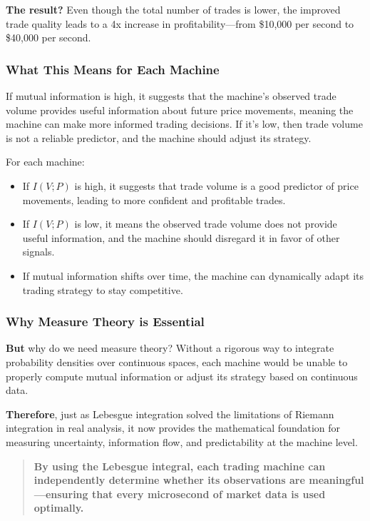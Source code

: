 \textbf{The result?} Even though the total number of trades is lower, the improved trade quality leads to a 4x increase in profitability—from \$10,000 per second to \$40,000 per second.

\subsubsection*{What This Means for Each Machine}

If mutual information is high, it suggests that the machine’s observed trade volume provides useful information about future price movements, meaning the machine can make more informed trading decisions. If it's low, then trade volume is not a reliable predictor, and the machine should adjust its strategy.

For each machine:
\begin{itemize}
    \item If \( I(V; P) \) is high, it suggests that trade volume is a good predictor of price movements, leading to more confident and profitable trades.
    \item If \( I(V; P) \) is low, it means the observed trade volume does not provide useful information, and the machine should disregard it in favor of other signals.
    \item If mutual information shifts over time, the machine can dynamically adapt its trading strategy to stay competitive.
\end{itemize}

\subsubsection*{Why Measure Theory is Essential}

\textbf{But} why do we need measure theory? Without a rigorous way to integrate probability densities over continuous spaces, each machine would be unable to properly compute mutual information or adjust its strategy based on continuous data.

\textbf{Therefore}, just as Lebesgue integration solved the limitations of Riemann integration in real analysis, it now provides the mathematical foundation for measuring uncertainty, information flow, and predictability at the machine level.

\begin{quote}
\textbf{By using the Lebesgue integral, each trading machine can independently determine whether its observations are meaningful—ensuring that every microsecond of market data is used optimally.}
\end{quote}

